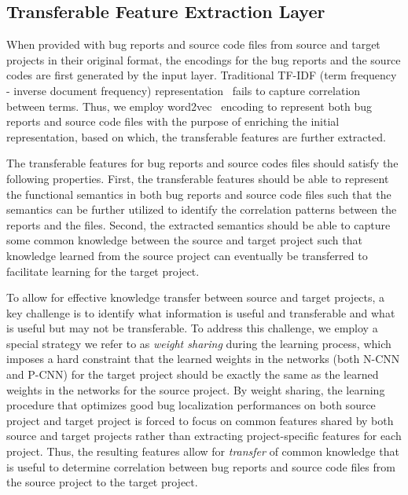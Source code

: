 \subsection{Transferable Feature Extraction Layer}

When provided with bug reports and source code files from source and target projects in their original format, the encodings for the bug reports and the source codes are first generated by the input layer. Traditional TF-IDF (term frequency - inverse document frequency) representation~\cite{christopher2008introduction} fails to capture correlation between terms. Thus, we employ word2vec~\cite{abs-1301-3781} encoding to represent both bug reports and source code files with the purpose of enriching the initial representation, based on which, the transferable features are further extracted.

The transferable features for bug reports and source codes files should satisfy the following properties. First, the transferable features should be able to represent the functional semantics in both bug reports and source code files such that the semantics can be further utilized to identify the correlation patterns between the reports and the files. Second, the extracted semantics should be able to capture some common knowledge between the source and target project such that knowledge learned from the source project can eventually be transferred to facilitate learning for the target project.

To allow for effective knowledge transfer between source and target projects, a key challenge is to identify what information is useful and transferable and what is useful but may not be transferable. To address this challenge, we employ a special strategy we refer to as \emph{weight sharing} during the learning process, which imposes a hard constraint that the learned weights in the networks (both N-CNN and P-CNN) for the target project should be exactly the same as the learned weights in the networks for the source project. By weight sharing, the learning procedure that optimizes good bug localization performances on both source project and target project is forced to focus on common features shared by both source and target projects rather than extracting project-specific features for each project. Thus, the resulting features allow for \emph{transfer} of common knowledge that is useful to determine correlation between bug reports and source code files from the source project to the target project.
 


